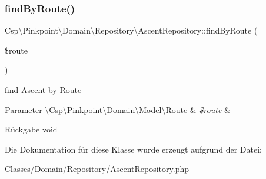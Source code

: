 \subsubsection{\texorpdfstring{find\+By\+Route()}{findByRoute()}}
{\footnotesize\ttfamily Csp\textbackslash{}\+Pinkpoint\textbackslash{}\+Domain\textbackslash{}\+Repository\textbackslash{}\+Ascent\+Repository\+::find\+By\+Route (\begin{DoxyParamCaption}\item[{}]{\$route }\end{DoxyParamCaption})}

find Ascent by Route


\begin{DoxyParams}[1]{Parameter}
\textbackslash{}\+Csp\textbackslash{}\+Pinkpoint\textbackslash{}\+Domain\textbackslash{}\+Model\textbackslash{}\+Route & {\em \$route} & \\
\hline
\end{DoxyParams}
\begin{DoxyReturn}{Rückgabe}
void 
\end{DoxyReturn}


Die Dokumentation für diese Klasse wurde erzeugt aufgrund der Datei\+:\begin{DoxyCompactItemize}
\item 
Classes/\+Domain/\+Repository/Ascent\+Repository.\+php\end{DoxyCompactItemize}
